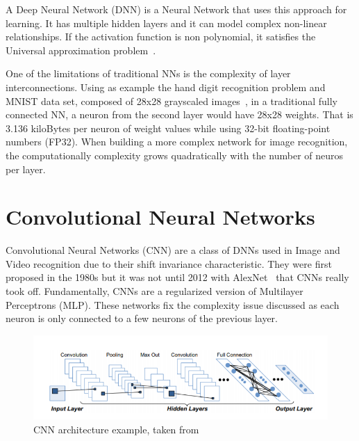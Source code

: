 A Deep Neural Network (DNN) is a Neural Network that uses this approach for
learning. It has multiple hidden layers and it can model complex non-linear
relationships. If the activation function is non polynomial, it satisfies the
Universal approximation problem~\cite{approximation:problem}.

One of the limitations of traditional NNs is the complexity of layer
interconnections. Using as example the hand digit recognition problem and MNIST
data set, composed of 28x28 grayscaled images~\cite{mnist:digits}, in a
traditional fully connected NN, a neuron from the second layer would have 28x28
weights. That is 3.136 kiloBytes per neuron of weight values while using 32-bit
floating-point numbers (FP32). When building a more complex network for image
recognition, the computationally complexity grows quadratically with the number
of neuros per layer.


\section{Convolutional Neural Networks}
\label{section:subcnn}

Convolutional Neural Networks (CNN) are a class of DNNs used in Image and Video
recognition due to their shift invariance characteristic. They were first
proposed in the 1980s but it was not until 2012 with AlexNet~\cite{alexnet} that
CNNs really took off. Fundamentally, CNNs are a regularized version of
Multilayer Perceptrons (MLP). These networks fix the complexity issue discussed
as each neuron is only connected to a few neurons of the previous layer.
 

 \begin{figure}[!htbp]
    \centering
    \includegraphics[width=1\textwidth]{Figures/convolutionlayer.png}
    \caption{CNN architecture example, taken from~\cite{cgracnn}}
    \label{CNNl}
\end{figure} 

